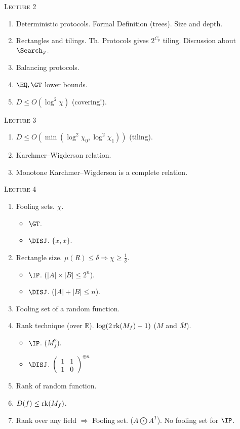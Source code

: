 \centerline{\textsc{Lecture 2}}

\begin{enumerate}
    \item Deterministic protocols. Formal Definition (trees). Size and depth.
    \item Rectangles and tilings. Th. Protocols gives $2^{C_p}$ tiling.
        Discussion about $\Search_{\varphi}$.
    \item Balancing protocols.
    \item $\EQ, \GT$ lower bounds.
    \item $D \le O(\log^2 \chi)$ (covering!).
\end{enumerate}


\centerline{\textsc{Lecture 3}}

\begin{enumerate}
    \item $D \le O(\min( \log^2 \chi_0, \log^2 \chi_1))$ (tiling).
    \item Karchmer--Wigderson relation.
    \item Monotone Karchmer--Wigderson is a complete relation.
\end{enumerate}

\centerline{\textsc{Lecture 4}}

\begin{enumerate}
    \item Fooling sets. $\chi$.
        \begin{itemize}
            \item $\GT$.
            \item $\DISJ$. $\{x, \bar{x}\}$.
        \end{itemize}
    \item Rectangle size. $\mu(R) \le \delta \Rightarrow \chi \ge \frac{1}{\delta}$.
        \begin{itemize}
            \item $\IP$. ($|A| \times |B| \le 2^n$).
            \item $\DISJ$. ($|A| + |B| \le n$).
        \end{itemize}
    \item Fooling set of a random function.
    \item Rank technique (over $\mathbb{R}$). $\log(2 \operatorname*{rk}(M_f) - 1)$ ($M$ and $\bar{M}$).
        \begin{itemize}
            \item $\IP$. ($M_f^2$).
            \item $\DISJ$.
                $\begin{pmatrix}
                    1 & 1\\
                    1 & 0
                \end{pmatrix}^{\oplus n}$
        \end{itemize}
    \item Rank of random function.
    \item $D(f) \le \operatorname*{rk}(M_f)$.
    \item Rank over any field $\Rightarrow$ Fooling set. ($A \bigodot A^T$). No fooling set for $\IP$.
\end{enumerate}



